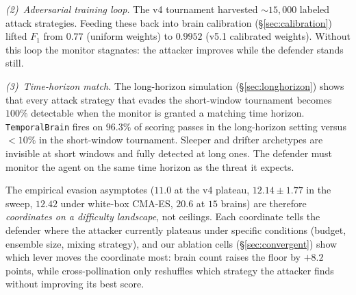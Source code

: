 \documentclass{article}
\begin{document}
\emph{(2)~Adversarial training loop.} The v4 tournament harvested
$\sim\!15{,}000$ labeled attack strategies. Feeding these back into
brain calibration (\S\ref{sec:calibration}) lifted $F_1$ from $0.77$
(uniform weights) to $0.9952$ (v5.1 calibrated weights). Without this
loop the monitor stagnates: the attacker improves while the defender
stands still.

\emph{(3)~Time-horizon match.} The long-horizon simulation
(\S\ref{sec:longhorizon}) shows that every attack strategy that
evades the short-window tournament becomes $100\%$ detectable when
the monitor is granted a matching time horizon.
\texttt{TemporalBrain} fires on $96.3\%$ of scoring passes in
the long-horizon setting versus $<\!10\%$ in the short-window
tournament. Sleeper and drifter archetypes are invisible at short
windows and fully detected at long ones. The defender must monitor
the agent on the same time horizon as the threat it expects.

The empirical evasion asymptotes ($11.0$ at the v4 plateau,
$12.14 \pm 1.77$ in the sweep, $12.42$ under white-box CMA-ES,
$20.6$ at $15$ brains) are therefore \emph{coordinates on a
difficulty landscape}, not ceilings. Each coordinate tells the
defender where the attacker currently plateaus under specific
conditions (budget, ensemble size, mixing strategy), and our
ablation cells (\S\ref{sec:convergent}) show which lever moves the
coordinate most: brain count raises the floor by $+8.2$ points,
while cross-pollination only reshuffles which strategy the attacker
finds without improving its best score.
\end{document}
